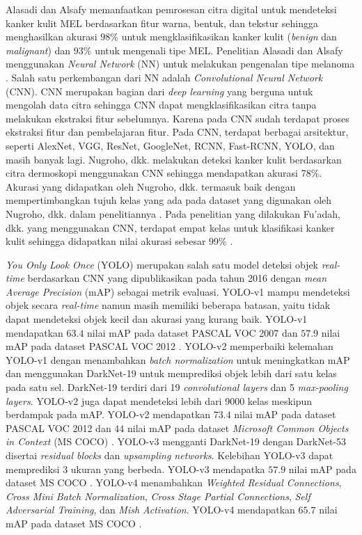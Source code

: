     Alasadi dan Alsafy memanfaatkan pemrosesan citra digital untuk mendeteksi kanker kulit MEL berdasarkan fitur warna, bentuk, dan tekstur sehingga menghasilkan akurasi $98\%$ untuk mengklasifikasikan kanker kulit (\textit{benign} dan \textit{malignant}) dan $93\%$ untuk mengenali tipe MEL. Penelitian Alasadi dan Alsafy menggunakan \textit{Neural Network} (NN) untuk melakukan pengenalan tipe melanoma \citep{Alasadi2015a}. Salah satu perkembangan dari NN adalah \textit{Convolutional Neural Network} (CNN). CNN merupakan bagian dari \textit{deep learning} yang berguna untuk mengolah data citra sehingga CNN dapat mengklasifikasikan citra tanpa melakukan ekstraksi fitur sebelumnya. Karena pada CNN sudah terdapat proses ekstraksi fitur dan pembelajaran fitur. Pada CNN, terdapat berbagai arsitektur, seperti AlexNet, VGG, ResNet, GoogleNet, RCNN, Fast-RCNN, YOLO, dan masih banyak lagi. Nugroho, dkk. melakukan deteksi kanker kulit berdasarkan citra dermoskopi menggunakan CNN sehingga mendapatkan akurasi 78\%. Akurasi yang didapatkan oleh Nugroho, dkk. termasuk baik dengan mempertimbangkan tujuh kelas yang ada pada dataset yang digunakan oleh Nugroho, dkk. dalam penelitiannya \citep{Nugroho2019}. Pada penelitian yang dilakukan Fu’adah, dkk. yang menggunakan CNN, terdapat empat kelas untuk klasifikasi kanker kulit sehingga didapatkan nilai akurasi sebesar 99\% \citep{Fuadah2020a}.

    \textit{You Only Look Once} (YOLO) merupakan salah satu model deteksi objek \textit{real-time} berdasarkan CNN yang dipublikasikan pada tahun 2016 dengan \textit{mean Average Precision} (mAP) sebagai metrik evaluasi. YOLO-v1 mampu mendeteksi objek secara \textit{real-time} namun masih memiliki beberapa batasan, yaitu tidak dapat mendeteksi objek kecil dan akurasi yang kurang baik. YOLO-v1 mendapatkan $63.4$ nilai mAP pada dataset PASCAL VOC 2007 dan $57.9$ nilai mAP pada dataset PASCAL VOC 2012 \citep{Redmon2016a}. YOLO-v2 memperbaiki kelemahan YOLO-v1 dengan menambahkan \textit{batch normalization} untuk meningkatkan mAP dan menggunakan DarkNet-19 untuk memprediksi objek lebih dari satu kelas pada satu sel. DarkNet-19 terdiri dari 19 \textit{convolutional layers} dan 5 \textit{max-pooling layers}. YOLO-v2 juga dapat mendeteksi lebih dari 9000 kelas meskipun berdampak pada mAP. YOLO-v2 mendapatkan $73.4$ nilai mAP pada dataset PASCAL VOC 2012 dan $44$ nilai mAP pada dataset \textit{Microsoft Common Objects in Context} (MS COCO) \citep{Redmon2017}. YOLO-v3 mengganti DarkNet-19 dengan DarkNet-53 disertai \textit{residual blocks} dan \textit{upsampling networks}. Kelebihan YOLO-v3 dapat memprediksi 3 ukuran yang berbeda. YOLO-v3 mendapatka $57.9$ nilai mAP pada dataset MS COCO \citep{Redmon2018}. YOLO-v4 menambahkan \textit{Weighted Residual Connections}, \textit{Cross Mini Batch Normalization}, \textit{Cross Stage Partial Connections}, \textit{Self Adversarial Training}, dan \textit{Mish Activation}. YOLO-v4 mendapatkan $65.7$ nilai mAP pada dataset MS COCO \citep{Bochkovskiy2020}.


